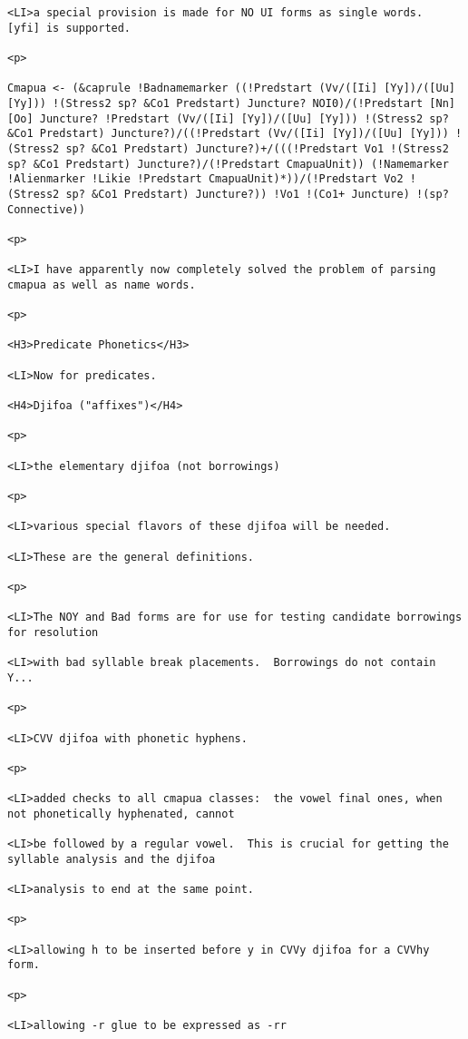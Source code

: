 \documentclass[12pt]{article}
\begin{document}
\begin{lstlisting}
<LI>a special provision is made for NO UI forms as single words.  [yfi] is supported.

<p>

Cmapua <- (&caprule !Badnamemarker ((!Predstart (Vv/([Ii] [Yy])/([Uu] [Yy])) !(Stress2 sp? &Co1 Predstart) Juncture? NOI0)/(!Predstart [Nn] [Oo] Juncture? !Predstart (Vv/([Ii] [Yy])/([Uu] [Yy])) !(Stress2 sp? &Co1 Predstart) Juncture?)/((!Predstart (Vv/([Ii] [Yy])/([Uu] [Yy])) !(Stress2 sp? &Co1 Predstart) Juncture?)+/(((!Predstart Vo1 !(Stress2 sp? &Co1 Predstart) Juncture?)/(!Predstart CmapuaUnit)) (!Namemarker !Alienmarker !Likie !Predstart CmapuaUnit)*))/(!Predstart Vo2 !(Stress2 sp? &Co1 Predstart) Juncture?)) !Vo1 !(Co1+ Juncture) !(sp? Connective))

<p>

<LI>I have apparently now completely solved the problem of parsing cmapua as well as name words.

<p>

<H3>Predicate Phonetics</H3>

<LI>Now for predicates.

<H4>Djifoa ("affixes")</H4>

<p>

<LI>the elementary djifoa (not borrowings)

<p>

<LI>various special flavors of these djifoa will be needed.

<LI>These are the general definitions.

<p>

<LI>The NOY and Bad forms are for use for testing candidate borrowings for resolution

<LI>with bad syllable break placements.  Borrowings do not contain Y...

<p>

<LI>CVV djifoa with phonetic hyphens.

<p>

<LI>added checks to all cmapua classes:  the vowel final ones, when not phonetically hyphenated, cannot

<LI>be followed by a regular vowel.  This is crucial for getting the syllable analysis and the djifoa

<LI>analysis to end at the same point.

<p>

<LI>allowing h to be inserted before y in CVVy djifoa for a CVVhy form.

<p>

<LI>allowing -r glue to be expressed as -rr


\end{lstlisting}
\end{document}
